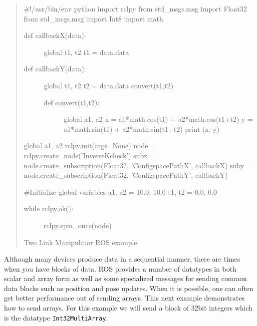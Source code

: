 \begin{quote}
\#!/usr/bin/env python import rclpy from std\_msgs.msg import Float32
from std\_msgs.msg import Int8 import math

\begin{description}
\item[def callbackX(data):]
global t1, t2 t1 = data.data
\item[def callbackY(data):]
global t1, t2 t2 = data.data convert(t1,t2)

\begin{description}
\item[def convert(t1,t2):]
global a1, a2 x = a1*math.cos(t1) + a2*math.cos(t1+t2) y =
a1*math.sin(t1) + a2*math.sin(t1+t2) print (x, y)
\end{description}
\end{description}

global a1, a2 rclpy.init(args=None) node =
rclpy.create\_node('InverseKcheck') subx =
node.create\_subscription(Float32, 'ConfigspacePathX', callbackX) suby =
node.create\_subscription(Float32, 'ConfigspacePathY', callbackY)

\#Initialize global variables a1, a2 = 10.0, 10.0 t1, t2 = 0.0, 0.0

\begin{description}
\item[while rclpy.ok():]
rclpy.spin\_once(node)
\end{description}

Two Link Manipulator ROS example.
\end{quote}

Although many devices produce data in a sequential manner, there are
times when you have blocks of data. ROS provides a number of datatypes
in both scalar and array form as well as some specialized messages for
sending common data blocks such as position and pose updates. When it is
possible, one can often get better performance out of sending arrays.
This next example demonstrates how to send arrays. For this example we
will send a block of 32bit integers which is the datatype
\texttt{Int32MultiArray}.

